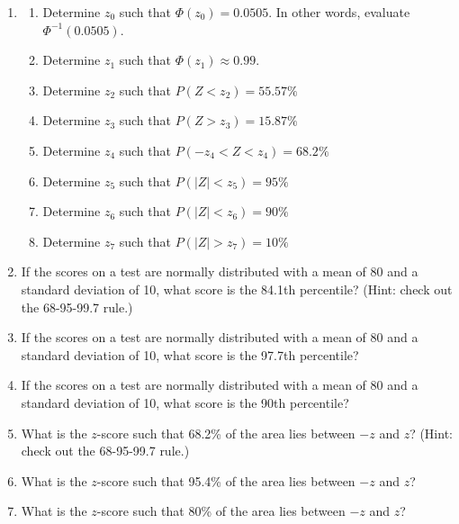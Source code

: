\documentclass[12pt,letterpaper]{article}
\begin{document}
\newpage
\begin{enumerate}[resume]
\item \begin{enumerate}
\item Determine $z_0$ such that $\Phi(z_0)=0.0505$. In other words, evaluate $\Phi^{-1}(0.0505)$.
\vfill
\item Determine $z_1$ such that $\Phi(z_1)\approx 0.99$.
\vfill
\item Determine $z_2$ such that $P(Z < z_2) = 55.57\%$
\vfill
\item Determine $z_3$ such that $P(Z > z_3) = 15.87\%$
\vfill
\item Determine $z_4$ such that $P(-z_4 < Z < z_4) = 68.2\%$
\vfill
\item Determine $z_5$ such that $P(|Z| < z_5) = 95\%$
\vfill
\item Determine $z_6$ such that $P(|Z| < z_6) = 90\%$
\vfill
\item Determine $z_7$ such that $P(|Z| > z_7) = 10\%$
\vfill
\end{enumerate}

\newpage
\item If the scores on a test are normally distributed with a mean of 80 and a standard deviation of 10, what score is the 84.1th percentile? (Hint: check out the 68-95-99.7 rule.)
\vfill
\item If the scores on a test are normally distributed with a mean of 80 and a standard deviation of 10, what score is the 97.7th percentile?
\vfill
\item If the scores on a test are normally distributed with a mean of 80 and a standard deviation of 10, what score is the 90th percentile?
\vfill
\item What is the $z$-score such that 68.2\% of the area lies between $-z$ and $z$? (Hint: check out the 68-95-99.7 rule.)
\vfill
\item What is the $z$-score such that 95.4\% of the area lies between $-z$ and $z$?
\vfill
\item What is the $z$-score such that 80\% of the area lies between $-z$ and $z$?
\vfill


\end{enumerate}
\newpage
\end{document}
